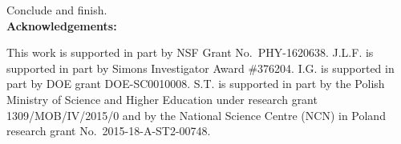 Conclude and finish.\\

{\bf Acknowledgements:}

This work is supported in part by NSF Grant No.~PHY-1620638. 
J.L.F. is supported in part by Simons Investigator Award \#376204.  
I.G. is supported in part by DOE grant DOE-SC0010008. 
S.T. is supported in part by the Polish Ministry of Science and Higher Education under research grant 1309/MOB/IV/2015/0 and by the National Science Centre (NCN) in Poland research grant No.\ 2015-18-A-ST2-00748.  
